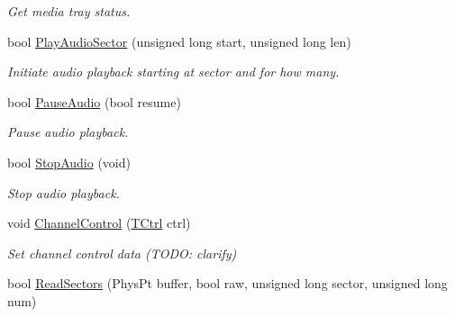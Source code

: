 \begin{DoxyCompactItemize}
\begin{DoxyCompactList}\small\item\em Get media tray status. \end{DoxyCompactList}\item 
bool \hyperlink{classCDROM__Interface__Image_afbb8b5443be56ba92b5a1287ba95f913}{Play\-Audio\-Sector} (unsigned long start, unsigned long len)
\begin{DoxyCompactList}\small\item\em Initiate audio playback starting at sector and for how many. \end{DoxyCompactList}\item 
\hypertarget{classCDROM__Interface__Image_ac74be8f64002ccf76b65c2fbd03077bd}{bool \hyperlink{classCDROM__Interface__Image_ac74be8f64002ccf76b65c2fbd03077bd}{Pause\-Audio} (bool resume)}\label{classCDROM__Interface__Image_ac74be8f64002ccf76b65c2fbd03077bd}

\begin{DoxyCompactList}\small\item\em Pause audio playback. \end{DoxyCompactList}\item 
\hypertarget{classCDROM__Interface__Image_a4a0af2e1be4fcb87e125b9d3e7aca327}{bool \hyperlink{classCDROM__Interface__Image_a4a0af2e1be4fcb87e125b9d3e7aca327}{Stop\-Audio} (void)}\label{classCDROM__Interface__Image_a4a0af2e1be4fcb87e125b9d3e7aca327}

\begin{DoxyCompactList}\small\item\em Stop audio playback. \end{DoxyCompactList}\item 
\hypertarget{classCDROM__Interface__Image_a6759cd7741be28cb61dd9903712edca1}{void \hyperlink{classCDROM__Interface__Image_a6759cd7741be28cb61dd9903712edca1}{Channel\-Control} (\hyperlink{structSCtrl}{T\-Ctrl} ctrl)}\label{classCDROM__Interface__Image_a6759cd7741be28cb61dd9903712edca1}

\begin{DoxyCompactList}\small\item\em Set channel control data (T\-O\-D\-O\-: clarify) \end{DoxyCompactList}\item 
\hypertarget{classCDROM__Interface__Image_a5121d2e82267d529bc462cecdac36791}{bool \hyperlink{classCDROM__Interface__Image_a5121d2e82267d529bc462cecdac36791}{Read\-Sectors} (Phys\-Pt buffer, bool raw, unsigned long sector, unsigned long num)}\label{classCDROM__Interface__Image_a5121d2e82267d529bc462cecdac36791}


\end{DoxyCompactItemize}
